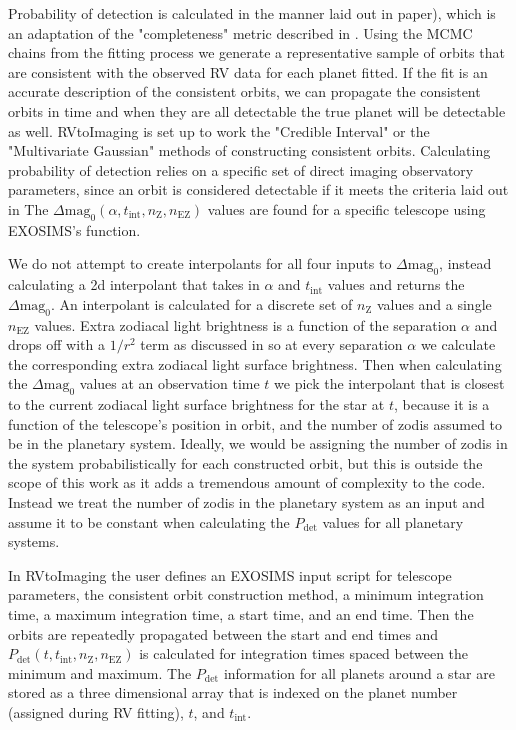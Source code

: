 Probability of detection is calculated in the manner laid out in
 paper), which is an adaptation of the "completeness"
metric described in \citep{brownSingleVisitPhotometric2005} . Using the MCMC
chains from the fitting process we generate a representative sample of orbits
that are consistent with the observed RV data for each planet fitted. If the
fit is an accurate description of the consistent orbits, we can propagate the
consistent orbits in time and when they are all detectable the true planet will
be detectable as well. RVtoImaging is set up to work the "Credible Interval" or
the "Multivariate Gaussian" methods of constructing consistent orbits.
Calculating probability of detection relies on a specific set of direct imaging
observatory parameters, since an orbit is considered detectable if it meets the
criteria laid out in  The $\Delta\textrm{mag}_0(\alpha,
t_{\textrm{int}}, n_\textrm{Z}, n_\textrm{EZ})$ values are found for a specific
telescope using EXOSIMS's  function. 

We do not attempt to create interpolants for all four inputs to
$\Delta\textrm{mag}_0$, instead calculating a 2d interpolant that takes in
$\alpha$ and $t_\textrm{int}$ values and returns the $\Delta\textrm{mag}_0$. An
interpolant is calculated for a discrete set of $n_\textrm{Z}$ values and a
single $n_\textrm{EZ}$ values. Extra zodiacal light brightness is a function of
the separation $\alpha$ and drops off with a $1/r^2$ term as discussed in
\citet{starkMaximizingExoEarthCandidate2014} so at every separation $\alpha$ we
calculate the corresponding extra zodiacal light surface brightness. Then when
calculating the $\Delta\textrm{mag}_0$ values at an observation time $t$ we
pick the interpolant that is closest to the current zodiacal light surface
brightness for the star at $t$, because it is a function of the telescope's
position in orbit, and the number of zodis assumed to be in the planetary
system. Ideally, we would be assigning the number of zodis in the system
probabilistically for each constructed orbit, but this is outside the scope of
this work as it adds a tremendous amount of complexity to the code. Instead we
treat the number of zodis in the planetary system as an input and assume it to
be constant when calculating the $P_\textrm{det}$ values for all planetary
systems.

In RVtoImaging the user defines an EXOSIMS input script for telescope
parameters, the consistent orbit construction method, a minimum integration
time, a maximum integration time, a start time, and an end time. Then the
orbits are repeatedly propagated between the start and end times and
$P_{\textrm{det}}(t, t_{\textrm{int}}, n_\textrm{Z}, n_\textrm{EZ})$ is
calculated for integration times spaced between the minimum and maximum. The
$P_{\textrm{det}}$ information for all planets around a star are stored as a
three dimensional array that is indexed on the planet number (assigned during
RV fitting), $t$, and $t_{\textrm{int}}$.

